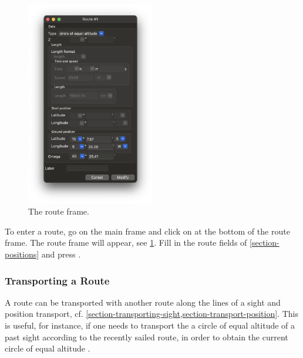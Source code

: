 \documentclass{ol-softwaremanual}
\begin{document}
\begin{figure}
  \centering
  \includegraphics[width=0.5\textwidth]{figures/route-frame.png}
  \caption{
    \label{fig-route-frame}
    The route frame.  
  }
\end{figure}


To enter a route, go on the main frame and click on  at the bottom of the route frame. The route frame will appear, see \cref{fig-route-frame}. Fill in the route fields of \cref{section-positions} and press . 

\subsubsection{Transporting a Route}\label{section-transporting-route}

A route can be transported with another route along the lines of a sight and position transport, cf. \cref{section-transporting-sight,section-transport-position}. This is useful, for instance, if one needs to transport the a  circle of equal altitude of a past sight according to the recently sailed route, in order to obtain the current circle of equal altitude \cite{bowditch2002the}. 



\pagebreak
\printacronyms[pages={display=all,seq/use=false}]


\end{document}
